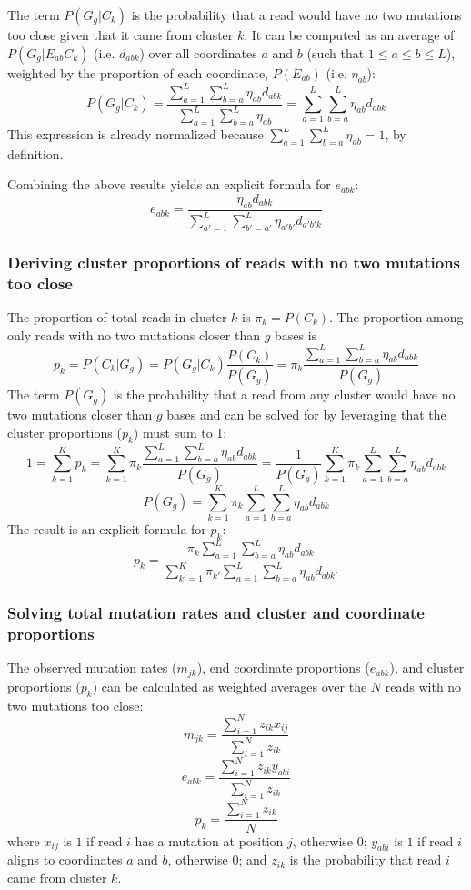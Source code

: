 \documentclass[main.tex]{subfiles}
\begin{document}
The term $P(G_g | C_k)$ is the probability that a read would have no two mutations too close given that it came from cluster $k$.
It can be computed as an average of $P(G_g | E_{ab} C_k)$ (i.e. $d_{abk}$) over all coordinates $a$ and $b$ (such that $1 \le a \le b \le L$), weighted by the proportion of each coordinate, $P(E_{ab})$ (i.e. $\eta_{ab}$):
$$P(G_g | C_k) = \frac{\sum_{a=1}^{L} \sum_{b=a}^{L} \eta_{ab} d_{abk}}{\sum_{a=1}^{L} \sum_{b=a}^{L} \eta_{ab}} = \sum_{a=1}^{L} \sum_{b=a}^{L} \eta_{ab} d_{abk}$$
This expression is already normalized because $\sum_{a=1}^{L} \sum_{b=a}^{L} \eta_{ab} = 1$, by definition.

Combining the above results yields an explicit formula for $e_{abk}$:
$$e_{abk} = \frac{\eta_{ab} d_{abk}}{\sum_{a'=1}^{L} \sum_{b'=a'}^{L} \eta_{a'b'} d_{a'b'k}}$$

\subsubsection{Deriving cluster proportions of reads with no two mutations too close}
\label{calc_p_clust_noclose}

The proportion of total reads in cluster $k$ is $\pi_k = P(C_k)$.
The proportion among only reads with no two mutations closer than $g$ bases is
$$p_k = P(C_k | G_g) = P(G_g | C_k) \frac{P(C_k)}{P(G_g)} = \pi_k \frac{\sum_{a=1}^{L} \sum_{b=a}^{L} \eta_{ab} d_{abk}}{P(G_g)}$$
The term $P(G_g)$ is the probability that a read from any cluster would have no two mutations closer than $g$ bases and can be solved for by leveraging that the cluster proportions ($p_k$) must sum to 1:
$$1 = \sum_{k=1}^{K} p_k = \sum_{k=1}^{K} \pi_k \frac{\sum_{a=1}^{L} \sum_{b=a}^{L} \eta_{ab} d_{abk}}{P(G_g)} = \frac{1}{{P(G_g)}} \sum_{k=1}^{K} \pi_k \sum_{a=1}^{L} \sum_{b=a}^{L} \eta_{ab} d_{abk}$$
$$P(G_g) = \sum_{k=1}^{K} \pi_k \sum_{a=1}^{L} \sum_{b=a}^{L} \eta_{ab} d_{abk}$$
The result is an explicit formula for $p_k$:
$$p_k = \frac{\pi_k \sum_{a=1}^{L} \sum_{b=a}^{L} \eta_{ab} d_{abk}}{\sum_{k'=1}^{K} \pi_{k'} \sum_{a=1}^{L} \sum_{b=a}^{L} \eta_{ab} d_{abk'}}$$

\subsubsection{Solving total mutation rates and cluster and coordinate proportions}
\label{calc_params}

The observed mutation rates ($m_{jk}$), end coordinate proportions ($e_{abk}$), and cluster proportions ($p_k$) can be calculated as weighted averages over the $N$ reads with no two mutations too close:
$$m_{jk} = \frac{\sum_{i=1}^{N} z_{ik} x_{ij}}{\sum_{i=1}^{N} z_{ik}}$$
$$e_{abk} = \frac{\sum_{i=1}^{N} z_{ik} y_{abi}}{\sum_{i=1}^{N} z_{ik}}$$
$$p_k = \frac{\sum_{i=1}^{N} z_{ik}}{N}$$
where $x_{ij}$ is $1$ if read $i$ has a mutation at position $j$, otherwise $0$; $y_{abi}$ is $1$ if read $i$ aligns to coordinates $a$ and $b$, otherwise $0$; and $z_{ik}$ is the probability that read $i$ came from cluster $k$.
\end{document}
